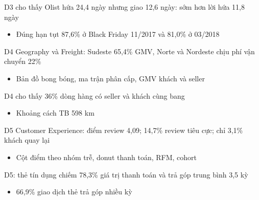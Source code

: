 \begin{frame}{D3 cho thấy Olist hứa 24,4 ngày nhưng giao 12,6 ngày: sớm hơn lời hứa 11,8 ngày}
\begin{itemize}
  \item Đúng hạn tụt 87,6\% ở Black Friday 11/2017 và 81,0\% ở 03/2018
\end{itemize}

\end{frame}

\begin{frame}{D4 Geography và Freight: Sudeste 65,4\% GMV, Norte và Nordeste chịu phí vận chuyển 22\%}
\begin{itemize}
  \item Bản đồ bong bóng, ma trận phân cấp, GMV khách và seller
\end{itemize}

\end{frame}

\begin{frame}{D4 cho thấy 36\% dòng hàng có seller và khách cùng bang}
\begin{itemize}
  \item Khoảng cách TB 598 km
\end{itemize}

\end{frame}

\begin{frame}{D5 Customer Experience: điểm review 4,09; 14,7\% review tiêu cực; chỉ 3,1\% khách quay lại}
\begin{itemize}
  \item Cột điểm theo nhóm trễ, donut thanh toán, RFM, cohort
\end{itemize}

\end{frame}

\begin{frame}{D5: thẻ tín dụng chiếm 78,3\% giá trị thanh toán và trả góp trung bình 3,5 kỳ}
\begin{itemize}
  \item 66,9\% giao dịch thẻ trả góp nhiều kỳ
\end{itemize}

\end{frame}

